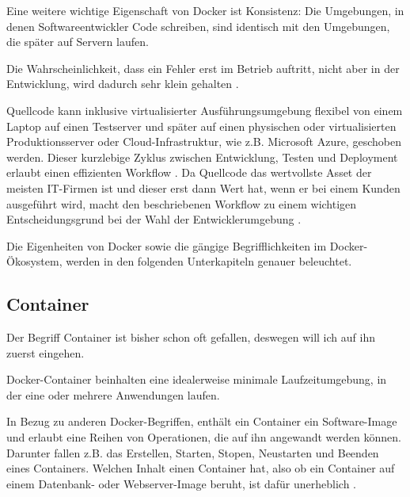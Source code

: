 \documentclass[../main.tex]{subfiles}
\begin{document}
    Eine weitere wichtige Eigenschaft von Docker ist Konsistenz: Die Umgebungen, in denen Softwareentwickler Code schreiben, sind identisch mit den Umgebungen, die später auf Servern laufen.


    Die Wahrscheinlichkeit, dass ein Fehler erst im Betrieb auftritt, nicht aber in der Entwicklung, wird dadurch sehr klein gehalten \cite[S.8]{dockerBook}.



    Quellcode kann inklusive virtualisierter Ausführungsumgebung flexibel von einem Laptop auf einen Testserver und später auf einen physischen oder virtualisierten Produktionsserver oder Cloud-Infrastruktur, wie z.B. Microsoft Azure, geschoben werden. Dieser kurzlebige Zyklus zwischen Entwicklung, Testen und Deployment erlaubt einen effizienten Workflow \cite[S.8+12]{dockerBook}.
    Da Quellcode das wertvollste Asset der meisten IT-Firmen ist und dieser erst dann Wert hat, wenn er bei einem Kunden ausgeführt wird, macht den beschriebenen Workflow zu einem wichtigen Entscheidungsgrund bei der Wahl der Entwicklerumgebung \cite[S.1]{dockerIntroIEEE}.




    Die Eigenheiten von Docker sowie die gängige Begrifflichkeiten im Docker-Ökosystem, werden in den folgenden Unterkapiteln genauer beleuchtet.
    \subsection{Container}

      Der Begriff \glqq{}Container\grqq{} ist bisher schon oft gefallen, deswegen will ich auf ihn zuerst eingehen.

      Docker-Container beinhalten eine idealerweise minimale Laufzeitumgebung, in der eine oder mehrere Anwendungen laufen.

      In Bezug zu anderen Docker-Begriffen, enthält ein Container ein Software-Image und erlaubt eine Reihen von Operationen, die auf ihn angewandt werden können. Darunter fallen z.B. das Erstellen, Starten, Stopen, Neustarten und Beenden eines Containers. Welchen Inhalt einen Container hat, also ob ein Container auf einem Datenbank- oder Webserver-Image beruht, ist dafür unerheblich \cite[S.12]{dockerBook}\cite[S.2]{dockerLXCKub}.
\end{document}
